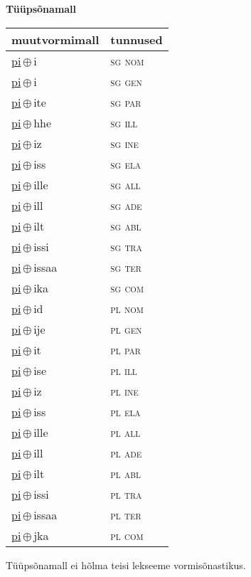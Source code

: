 

\vspace{3.5em}
\noindent \begin{minipage}{\textwidth}
\noindent \textbf{Tüüpsõnamall \,}\\

\begin{sideways}
\begin{tabular}{l l}
muutvormimall & tunnused \\
\hline
\underline{pi}\,$\oplus$\,i & \textsc{ sg nom } \\
\underline{pi}\,$\oplus$\,i & \textsc{ sg gen } \\
\underline{pi}\,$\oplus$\,ite & \textsc{ sg par } \\
\underline{pi}\,$\oplus$\,hhe & \textsc{ sg ill } \\
\underline{pi}\,$\oplus$\,iz & \textsc{ sg ine } \\
\underline{pi}\,$\oplus$\,iss & \textsc{ sg ela } \\
\underline{pi}\,$\oplus$\,ille & \textsc{ sg all } \\
\underline{pi}\,$\oplus$\,ill & \textsc{ sg ade } \\
\underline{pi}\,$\oplus$\,ilt & \textsc{ sg abl } \\
\underline{pi}\,$\oplus$\,issi & \textsc{ sg tra } \\
\underline{pi}\,$\oplus$\,issaa & \textsc{ sg ter } \\
\underline{pi}\,$\oplus$\,ika & \textsc{ sg com } \\
\underline{pi}\,$\oplus$\,id & \textsc{ pl nom } \\
\underline{pi}\,$\oplus$\,ije & \textsc{ pl gen } \\
\underline{pi}\,$\oplus$\,it & \textsc{ pl par } \\
\underline{pi}\,$\oplus$\,ise & \textsc{ pl ill } \\
\underline{pi}\,$\oplus$\,iz & \textsc{ pl ine } \\
\underline{pi}\,$\oplus$\,iss & \textsc{ pl ela } \\
\underline{pi}\,$\oplus$\,ille & \textsc{ pl all } \\
\underline{pi}\,$\oplus$\,ill & \textsc{ pl ade } \\
\underline{pi}\,$\oplus$\,ilt & \textsc{ pl abl } \\
\underline{pi}\,$\oplus$\,issi & \textsc{ pl tra } \\
\underline{pi}\,$\oplus$\,issaa & \textsc{ pl ter } \\
\underline{pi}\,$\oplus$\,jka & \textsc{ pl com } \\
\end{tabular}
\end{sideways}
\label{tab:tüüpsõnamall-pii}

\end{minipage}

 
\vspace{1em}
\noindent Tüüpsõnamall  ei hõlma teisi lekseeme vormi\-sõnastikus.
